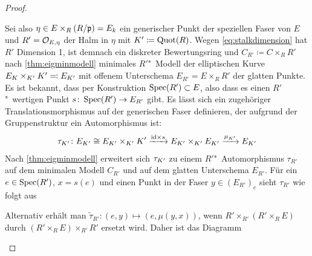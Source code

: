 \begin{Lemma}
\begin{proof}
\begin{description}
      Sei also $\eta\in E\times_R (R/\mathfrak{p})=E_k$ ein generischer Punkt der
      speziellen Faser von $E$ und ${R'=\mathcal{O}_{E,\eta}}$ der Halm in
      $\eta$ mit $K'\coloneqq\operatorname{Quot}(R)$.
      Wegen \autoref{eq:stalkdimension} hat $R'$
      Dimension 1, ist demnach ein diskreter Bewertungsring und
      $C_{R'}\coloneqq C\times_R R'$ nach \ref{thm:eigminmodell}
      minimales $R'$"~Modell der elliptischen Kurve
      $E_{K}\times_{K'}K'\eqqcolon E_{K'}$ mit offenem Unterschema
      ${E_{R'}=E\times_R R'}$ der glatten Punkte.
      Es ist bekannt, dass per Konstruktion $\operatorname{Spec}(R')\subset E$, also dass
      es einen $R'$"~wertigen Punkt $s\colon\operatorname{Spec}(R')\to E_{R'}$ gibt.
      Es lässt sich ein zugehöriger Translationsmorphismus auf der
      generischen Faser definieren, der aufgrund der Gruppenstruktur
      ein Automorphismus ist:
      \begin{gather*}
        \tau_{K'}\colon
        E_{K'}\cong E_{K'}\times_{K'}K'
        \xrightarrow{\mathrm{id}\times s}
        E_{K'}\times_{K'}E_{K'}
        \xrightarrow{\mu_{K'}}
        E_{K'}
      \end{gather*}
      Nach \ref{thm:eigminmodell} erweitert sich $\tau_{K'}$ zu
      einem $R'$"~Automorphismus $\tau_{R'}$ auf dem minimalen Modell
      $C_{R'}$ und auf dem glatten Unterschema $E_{R'}$.
      Für ein $e\in\operatorname{Spec}(R')$, $x=s(e)$ und einen Punkt in der Faser
      $y\in(E_{R'})_e$ sieht $\tau_{R'}$ wie folgt aus
      \begin{center}
      \end{center}
      Alternativ erhält man
      $\tilde\tau_{R'}\colon(e,y)\mapsto(e,\mu(y,x))$, wenn
      $R'\times_{R'}(R'\times_R E)$ durch $(R'\times_R E)\times_{R'}R'$
      ersetzt wird.
      Daher ist das Diagramm
      \begin{center}
\end{center}
\end{description}
\end{proof}
\end{Lemma}
